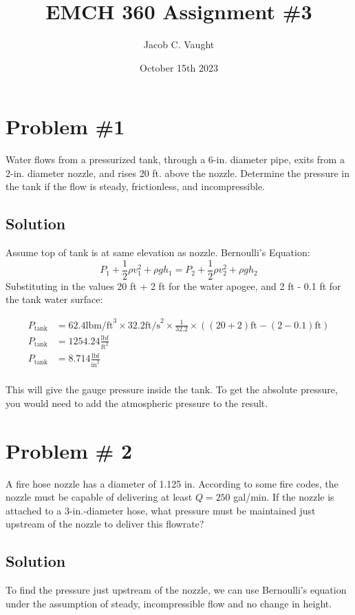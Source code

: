 \documentclass{article}
\title{EMCH 360 Assignment \#3}
\author{Jacob C. Vaught}
\date{October 15th 2023}
\begin{document}
\maketitle
\section*{Problem \#1}

Water flows from a pressurized tank, through a 6-in. diameter pipe, exits from a 2-in. diameter nozzle, and rises 20 ft. above the nozzle. Determine the pressure in the tank if the flow is steady, frictionless, and incompressible.

\subsection*{Solution}

Assume top of tank is at same elevation as nozzle. 
\newline\newline
Bernoulli's Equation:
\[
P_1 + \frac{1}{2} \rho v_1^2 + \rho gh_1 = P_2 + \frac{1}{2} \rho v_2^2 + \rho gh_2
\]
Substituting in the values 20 ft + 2 ft for the water apogee, and 2 ft - 0.1 ft for the tank water surface:

\[
\begin{aligned}
P_{\text{tank}} &= 62.4 \text{lbm/ft}^3 \times 32.2 \text{ft/s}^2 \times \frac{1}{32.2} \times \left( (20+2)  \text{ft} - (2-0.1) \text{ft} \right) \\
P_{\text{tank}} &= 1254.24 \frac{\text{lbf}}{\text{ft}^2} \\
P_{\text{tank}} &= 8.714 \frac{\text{lbf}}{\text{in}^2} \\
\end{aligned}
\]

This will give the gauge pressure inside the tank. To get the absolute pressure, you would need to add the atmospheric pressure to the result.
\newpage
\section*{Problem \# 2}
A fire hose nozzle has a diameter of 1.125 in. According to some fire codes, the nozzle must be capable of delivering at least \( Q = 250 \) gal/min. If the nozzle is attached to a 3-in.-diameter hose, what pressure must be maintained just upstream of the nozzle to deliver this flowrate?

\subsection*{Solution}
To find the pressure just upstream of the nozzle, we can use Bernoulli's equation under the assumption of steady, incompressible flow and no change in height. 
\end{document}
